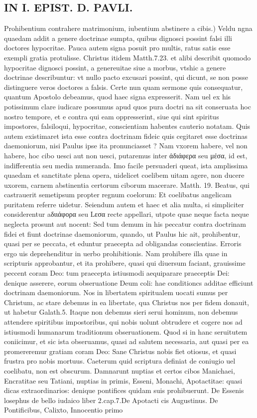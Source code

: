 \documentclass{article}
\begin{document}
\begin{pages}
\section*{IN I. EPIST. D. PAVLI. }
\marginpar{[ p.92 ]}\pstart Prohibentium contrahere matrimonium, iubentium abstinere a cibis.) Veldu ngna quaedam addit a genere doctrinae sumpta, quibus dignosci possint falsi illi doctores hypocritae. Pauca autem signa posuit pro multis, ratus satis esse exempli gratia protulisse. Christus itidem Matth.7.23. et alibi describit quomodo hypocritae dignosci possint, a genereuitae siue a morbus, vtshic a genere doctrinae describuntur: vt nullo pacto excusari possint, qui dicunt, se non posse distinguere veros doctores a falsis. Certe nun quam sermone quis consequatur, quantum Apostolo debeamus, quod haec signa expresserit. Nam uel ex his potissimum clare iudicare possumus apud quos pura doctri na sit conseruata hoc nostro tempore, et e contra qui eam oppresserint, siue qui sint spiritus impostores, falsiloqui, hypocritae, conscientiam habentes cauterio notatam. Quis autem existimaret ista esse contra doctrinam fideic quis cegitaret esse doctrinas daemoniorum, nisi Paulus ipse ita pronunciasset ? Nam vxorem habere, vel non habere, hoc cibo uesci aut non uesci, putaremus inter ἀδιάφερα seu μέσα, id est, indifferentia seu media numeranda. Imo facile persuaderi queat, ista amplissima quaedam et sanctitate plena opera, uidelicet coelibem uitam agere, non ducere uxorem, carnem abstinentia certorum ciborum macerare. Matth. 19. Beatus, qui castrauerit semetipsum propter regnum coelorum: Et coelibatus angelicam puritatem referre uidetur. Seiendum autem et haec et alia multa, si simpliciter considerentur aδιιάφορα seu Lεσα recte appellari, utpote quae neque facta neque neglecta prosunt aut nocent: Sed tum demum in his peccatur contra doctrinam fidei et fiunt doctrinae daemoniorum, quando, ut Paulus hic ait, prohibentur, quasi per se peccata, et eduntur praecepta ad obligandas conscientias. Erroris ergo uis deprehenditur in uerbo prohibitionis. Nam prohibere illa quae in scripturis approbantur, et ita prohibere, quasi qui diuersum faciant, grauissime peccent coram Deo: tum praecepta istiusmodi aequiparare praeceptis Dei: denique asserere, eorum obseruatione Deum coli: hae conditioncs additae efficiunt doctrinam daemoniorum. Nos in libertatem spiritualem uocati sumus per Christum, ac stare debemus in ea libertate, qua Christus nos per fidem donauit, ut habetur Galath.5. Itaque non debemus sieri serui hominum, non debemus attendere spiritibus impostoribus, qui nobis uolunt obtrudere et cogere nos ad istiusmodi humanarum traditionum obseruationem. Quod si in hanc seruitutem coniicimur, et sic ista obseruamus, quasi ad salutem necessaria, aut quasi per ea promereremur gratiam coram Deo: Sane Christus nobis fiet otiosus, et quasi frustra pro nobis mortuus. Caeterum quid scriptura definiat de coniugio uel coelibatu, non est obscurum. Damnarunt nuptias et certos cibos Manichaei, Encratitae seu Tatiani, nuptias in primis, Esseni, Monachi, Apotactitae: quasi dicas extraordinarios: denique pontifices quidam suis prohibuerunt. De Essenis losephus de bello iudaico liber 2.cap.7.De Apotacti cis Augustinus. De Pontificibus, Calixto, Innocentio primo 
\end{pages}
\end{document}
